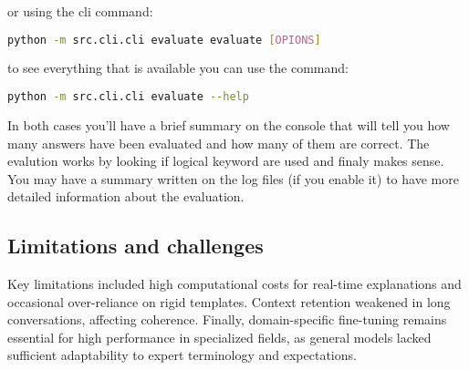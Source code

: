 or using the cli command:
\begin{lstlisting}[language=bash]
    python -m src.cli.cli evaluate evaluate [OPIONS]
\end{lstlisting}

to see everything that is available you can use the command:
\begin{lstlisting}[language=bash]
    python -m src.cli.cli evaluate --help
\end{lstlisting}

In both cases you'll have a brief summary on the console that will tell you how many answers have been evaluated and how many of them are correct. The evalution works by looking if logical keyword are used and finaly makes sense.
You may have a summary written on the log files (if you enable it) to have more detailed information about the evaluation.

\subsection{Limitations and challenges}

Key limitations included high computational costs for real-time explanations and occasional over-reliance on rigid templates. Context retention weakened in long conversations, affecting coherence.
Finally, domain-specific fine-tuning remains essential for high performance in specialized fields, as general models lacked sufficient adaptability to expert terminology and expectations.
